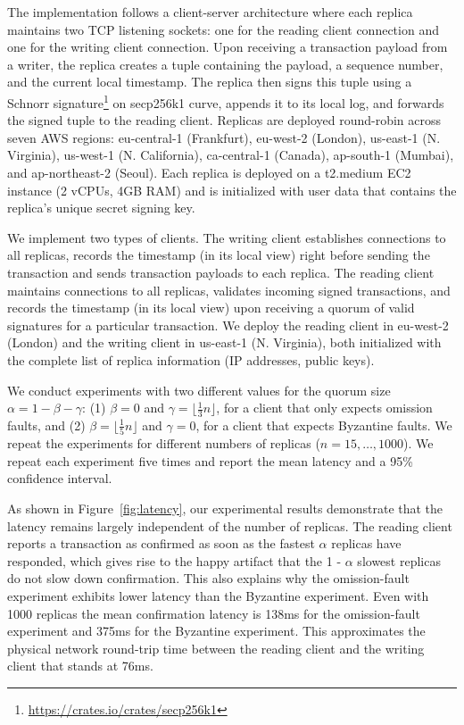 \documentclass[pdflatex,sn-mathphys-num]{sn-jnl}%
\theoremstyle{thmstyleone}%
\theoremstyle{thmstyletwo}%
\theoremstyle{thmstylethree}%
\let\oldalpha\alpha
\renewcommand{\alpha}{\ensuremath{\oldalpha}\xspace}
\let\oldbeta\beta
\renewcommand{\beta}{\ensuremath{\oldbeta}\xspace}
\let\oldgamma\gamma
\renewcommand{\gamma}{\ensuremath{\oldgamma}\xspace}
\begin{document}
The implementation follows a client-server architecture where each replica maintains two TCP listening sockets:
one for the reading client connection and one for the writing client connection. Upon receiving a transaction
payload from a writer, the replica creates a tuple containing the payload, a sequence number, and the current local timestamp.
The replica then signs this tuple using a Schnorr signature\footnote{\url{https://crates.io/crates/secp256k1}} on secp256k1 curve, appends it to its local log, and forwards
the signed tuple to the reading client.
Replicas are deployed round-robin across seven
AWS regions: eu-central-1 (Frankfurt), eu-west-2 (London), us-east-1 (N. Virginia), us-west-1 (N. California),
ca-central-1 (Canada), ap-south-1 (Mumbai), and ap-northeast-2 (Seoul). Each replica is deployed on a
t2.medium EC2 instance (2 vCPUs, 4GB RAM) and is initialized with user data that contains
the replica's unique secret signing key.

We implement two types of clients. The writing client establishes connections to all replicas, records
the timestamp (in its local view) right before sending the transaction and sends transaction
payloads to each replica. The reading client maintains connections to all replicas, validates incoming signed
transactions, and records the timestamp (in its local view) upon receiving a quorum of valid signatures for a particular transaction.
We deploy the reading
client in eu-west-2 (London) and the writing client in us-east-1 (N. Virginia), both initialized with the complete
list of replica information (IP addresses, public keys).

We conduct experiments with two different values for the quorum size $\alpha = 1 - \beta - \gamma$: (1) $\beta =0 $ and $\gamma = \lfloor \frac{1}{3} n \rfloor$, for a client that only expects omission faults,
and (2) $\beta = \lfloor\frac{1}{5}n\rfloor$ and $\gamma = 0$, for a client that expects Byzantine faults.
We repeat the experiments for
different numbers of replicas ($n = 15, \ldots, 1000$).
We repeat each experiment five times and report the mean latency and a 95\% confidence interval.

As shown in Figure~\ref{fig:latency}, our experimental results demonstrate that the latency remains largely independent
of the number of replicas.
The reading client reports a transaction as confirmed as soon as the fastest
$\alpha$ replicas have responded, which gives rise to the happy artifact that the 1 - $\alpha$ slowest replicas
do not slow down confirmation.
This also explains why the omission-fault experiment exhibits lower latency than the Byzantine experiment.
Even with 1000 replicas the mean confirmation latency is 138ms for the omission-fault experiment and 375ms for the Byzantine experiment.
This approximates
the physical network round-trip time between the reading client and the writing client that stands at 76ms.
\end{document}
